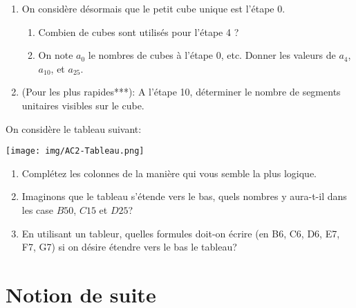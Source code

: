 \documentclass[a4paper]{article}
\begin{document}
\begin{activite}{}{}
\begin{enumerate}
\begin{enumerate}
    \end{enumerate}
     \item On considère désormais que le petit cube unique est l'étape 0.
      \begin{enumerate}
       \item Combien de cubes sont utilisés pour l'étape 4 ?
      \vspace{1cm}
      \item On note $a_0$ le nombres de cubes à l'étape $0$, etc. Donner les valeurs de $a_4$, $a_{10}$, et $a_{25}$.
        \vspace{2cm}
    \end{enumerate}
  
    \item (Pour les plus rapides***): A l'étape 10, déterminer le nombre de segments unitaires visibles sur le cube.
    \vspace{2cm}
  
  \end{enumerate}
  
\end{activite}


\pagebreak

\begin{activite}{}{}
		On considère le tableau suivant:
		\begin{center}
			\texttt{[image: img/AC2-Tableau.png]}
		\end{center}

	\begin{enumerate}
		\item Complétez les colonnes de la manière qui vous semble la plus logique.
		\item Imaginons que le tableau s'étende vers le bas, quels nombres y aura-t-il dans
		les case $B50$, $C15$ et $D25$?
		\vspace{4cm}
		\item En utilisant un tableur, quelles formules doit-on écrire (en B6, C6, D6, E7, F7, G7) si on désire étendre vers le bas
		le tableau?
    \vspace{3cm}
	\end{enumerate}
\end{activite}

\pagebreak

\section{Notion de suite}
\end{document}
